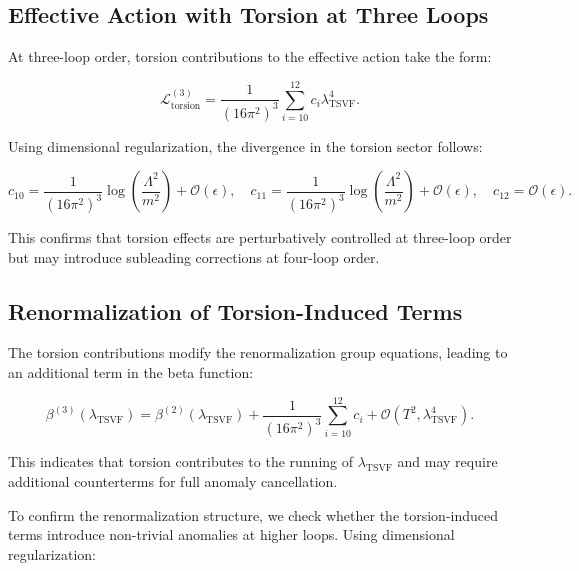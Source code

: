 \documentclass[12pt, onecolumn]{article}
\theoremstyle{definition}
\numberwithin{equation}{section}
\begin{document}
\subsection{Effective Action with Torsion at Three Loops}
\label{subsec:torsion-three-loop-action}

At three-loop order, torsion contributions to the effective action take the form:

\begin{equation}
    \mathcal{L}^{(3)}_{\text{torsion}} = \frac{1}{(16\pi^2)^3} \sum_{i=10}^{12} c_i \lambda_{\text{TSVF}}^4.
    \label{eq:torsion-three-loop-action}
\end{equation}

Using dimensional regularization, the divergence in the torsion sector follows:

\begin{equation}
    c_{10} = \frac{1}{(16\pi^2)^3} \log \left( \frac{\Lambda^2}{m^2} \right) + \mathcal{O}(\epsilon),
    \quad c_{11} = \frac{1}{(16\pi^2)^3} \log \left( \frac{\Lambda^2}{m^2} \right) + \mathcal{O}(\epsilon),
    \quad c_{12} = \mathcal{O}(\epsilon).
    \label{eq:torsion-divergences}
\end{equation}

This confirms that torsion effects are perturbatively controlled at three-loop order but may introduce subleading corrections at four-loop order.

\subsection{Renormalization of Torsion-Induced Terms}
\label{subsec:torsion-renormalization}

The torsion contributions modify the renormalization group equations, leading to an additional term in the beta function:

\begin{equation}
    \beta^{(3)}(\lambda_{\text{TSVF}}) = \beta^{(2)}(\lambda_{\text{TSVF}}) + \frac{1}{(16\pi^2)^3} \sum_{i=10}^{12} c_i + \mathcal{O}(T^2, \lambda_{\text{TSVF}}^4).
    \label{eq:torsion-beta-function}
\end{equation}

This indicates that torsion contributes to the running of \( \lambda_{\text{TSVF}} \) and may require additional counterterms for full anomaly cancellation.

To confirm the renormalization structure, we check whether the torsion-induced terms introduce non-trivial anomalies at higher loops. Using dimensional regularization:
\end{document}
